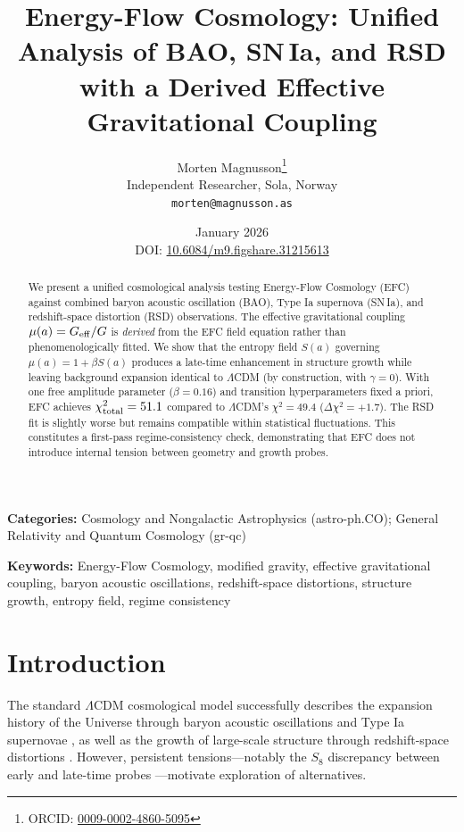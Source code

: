\documentclass[12pt,a4paper]{article}
\title{Energy-Flow Cosmology: Unified Analysis of BAO, SN\,Ia, and RSD\\
with a Derived Effective Gravitational Coupling}
\author{Morten Magnusson\footnote{ORCID: \href{https://orcid.org/0009-0002-4860-5095}{0009-0002-4860-5095}}\\
\small Independent Researcher, Sola, Norway\\
\small \texttt{morten@magnusson.as}}
\date{January 2026\\[1em]
\small DOI: \href{https://doi.org/10.6084/m9.figshare.31215613}{10.6084/m9.figshare.31215613}}
\begin{document}
\maketitle

\begin{abstract}
We present a unified cosmological analysis testing Energy-Flow Cosmology (EFC) against 
combined baryon acoustic oscillation (BAO), Type Ia supernova (SN\,Ia), and redshift-space 
distortion (RSD) observations. The effective gravitational coupling $\mu(a) = G_{\rm eff}/G$ 
is \emph{derived} from the EFC field equation rather than phenomenologically fitted. 
We show that the entropy field $S(a)$ governing $\mu(a) = 1 + \beta S(a)$ produces a 
late-time enhancement in structure growth while leaving background expansion identical 
to $\Lambda$CDM (by construction, with $\gamma = 0$). With one free amplitude parameter 
($\beta = 0.16$) and transition hyperparameters fixed a priori, EFC achieves 
$\chi^2_{\rm total} = 51.1$ compared to $\Lambda$CDM's $\chi^2 = 49.4$ ($\Delta\chi^2 = +1.7$). 
The RSD fit is slightly worse but remains compatible within statistical fluctuations. 
This constitutes a first-pass regime-consistency check, demonstrating that EFC does not 
introduce internal tension between geometry and growth probes.
\end{abstract}

\vspace{1em}
\noindent\textbf{Categories:} Cosmology and Nongalactic Astrophysics (astro-ph.CO); 
General Relativity and Quantum Cosmology (gr-qc)

\vspace{0.5em}
\noindent\textbf{Keywords:} Energy-Flow Cosmology, modified gravity, effective gravitational 
coupling, baryon acoustic oscillations, redshift-space distortions, structure growth, 
entropy field, regime consistency

\section{Introduction}

The standard $\Lambda$CDM cosmological model successfully describes the expansion history 
of the Universe through baryon acoustic oscillations \citep{DESI2024} and Type Ia supernovae 
\citep{Brout2022}, as well as the growth of large-scale structure through redshift-space 
distortions \citep{Alam2021}. However, persistent tensions---notably the $S_8$ discrepancy 
between early and late-time probes \citep{DiValentino2021}---motivate exploration of 
alternatives.
\end{document}
